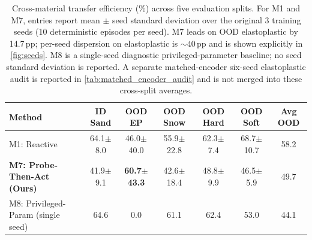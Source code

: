 \begin{table}[t]
\centering
\caption{Cross-material transfer efficiency (\%) across five evaluation splits. For M1 and M7, entries report mean $\pm$ seed standard deviation over the original 3 training seeds (10 deterministic episodes per seed). M7 leads on OOD elastoplastic by 14.7\,pp; per-seed dispersion on elastoplastic is $\sim 40$\,pp and is shown explicitly in \cref{fig:seeds}. M8 is a single-seed diagnostic privileged-parameter baseline; no seed standard deviation is reported. A separate matched-encoder six-seed elastoplastic audit is reported in \cref{tab:matched_encoder_audit} and is not merged into these cross-split averages.}
\label{tab:main_results}
\footnotesize
\setlength{\tabcolsep}{3pt}
\begin{tabular}{@{}lcccccc@{}}
\toprule
Method & ID Sand & OOD EP & OOD Snow & OOD Hard & OOD Soft & Avg OOD \\
\midrule
M1: Reactive & 64.1$\pm$8.0 & 46.0$\pm$40.0 & 55.9$\pm$22.8 & 62.3$\pm$7.4 & 68.7$\pm$10.7 & 58.2 \\
\textbf{M7: Probe-Then-Act (Ours)} & 41.9$\pm$9.1 & \textbf{60.7$\pm$43.3} & 42.6$\pm$18.4 & 48.8$\pm$9.9 & 46.5$\pm$5.9 & 49.7 \\
M8: Privileged-Param (single seed) & 64.6 & 0.0 & 61.1 & 62.4 & 53.0 & 44.1 \\
\bottomrule
\end{tabular}
\end{table}
